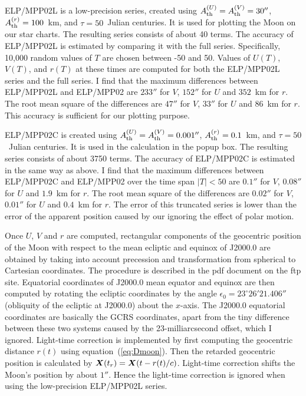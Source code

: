 \documentclass[12pt]{article}
\newcommand{\ve}[1]{\mbox{\boldmath $#1$}}
\begin{document}
ELP/MPP02L is a low-precision series, created using 
$A^{(U)}_{\rm th}=A^{(V)}_{\rm th}=30''$, $A^{(r)}_{\rm th}=100$~km, and $\tau = 50$~Julian centuries. It is used for plotting the Moon on our star charts. 
The resulting series consists of about 40 terms. 
The accuracy of ELP/MPP02L is estimated by comparing it with the full series. 
Specifically, 10,000 random values of $T$ are chosen between -50 and 50. Values of 
$U(T)$, $V(T)$, and $r(T)$ at these times are computed for both the ELP/MPP02L series and the 
full series. I find that the maximum differences between ELP/MPP02L and ELP/MPP02 
are $233''$ for $V$, $152''$ for $U$ and $352$~km for $r$. The root mean square 
of the differences are $47''$ for $V$, $33''$ for $U$ and $86$~km for $r$. This accuracy 
is sufficient for our plotting purpose.

ELP/MPP02C is created using $A^{(U)}_{\rm th}=A^{(V)}_{\rm th}=0.001''$, 
$A^{(r)}_{\rm th}=0.1$~km, and $\tau = 50$~Julian centuries. It is used in 
the calculation in the popup box. The resulting series consists of about 3750 terms. 
The accuracy of ELP/MPP02C is estimated in the same way as above. I find that 
the maximum differences between ELP/MPP02C and ELP/MPP02 over the time 
span $|T|<50$ are $0.1''$ for $V$, $0.08''$ for $U$ and $1.9$~km for $r$. 
The root mean square of the differences are $0.02''$ for $V$, $0.01''$ for 
$U$ and $0.4$~km for $r$. The error of this truncated series is lower than 
the error of the apparent position caused by our ignoring the effect of 
polar motion.

Once $U$, $V$ and $r$ are computed, rectangular components of the geocentric 
position of the Moon with respect to the mean ecliptic and equinox of J2000.0 
are obtained by taking into account precession and transformation from spherical 
to Cartesian coordinates. The procedure is described in the pdf document on the ftp site. 
Equatorial coordinates of J2000.0 mean equator and equinox are then computed 
by rotating the ecliptic coordinates by the angle $\epsilon_0=23^\circ 26' 21.406''$ 
(obliquity of the ecliptic at J2000.0) about the $x$-axis. 
The J2000.0 equatorial coordinates are basically the GCRS coordinates, 
apart from the tiny difference 
between these two systems caused by the 23-milliarcsecond offset, which I ignored. 
Light-time correction is implemented by first computing the geocentric 
distance $r(t)$ using equation~(\ref{eq:Dmoon}). Then the retarded geocentric 
position is calculated by $\ve{X}(t_r) = \ve{X}(t-r(t)/c)$. Light-time correction 
shifts the Moon's position by about $1''$. Hence the light-time 
correction is ignored when using the low-precision ELP/MPP02L series. 
\end{document}
